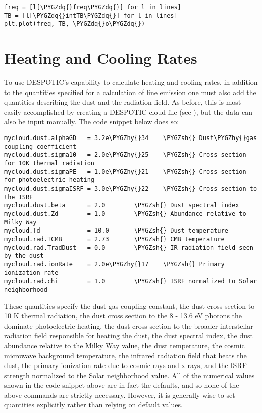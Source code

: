 \documentclass[letterpaper,10pt,english]{sphinxmanual}
\def\PYGZsh{\char`\#}
\def\PYGZhy{\char`\-}
\def\PYGZdq{\char`\"}
\begin{document}
\begin{Verbatim}[commandchars=\\\{\}]
freq = [l[\PYGZdq{}freq\PYGZdq{}] for l in lines]
TB = [l[\PYGZdq{}intTB\PYGZdq{}] for l in lines]
plt.plot(freq, TB, \PYGZdq{}o\PYGZdq{})
\end{Verbatim}


\section{Heating and Cooling Rates}
\label{functions:heating-and-cooling-rates}
To use DESPOTIC's capability to calculate heating and cooling rates,
in addition to the quantities specified for a calculation of line
emission one must also add the quantities describing the dust and the
radiation field. As before, this is most easily accomplished by
creating a DESPOTIC cloud file (see {\hyperref[cloudfiles:sec\string-cloudfiles]{}}), but the
data can also be input manually. The code snippet below does so:

\begin{Verbatim}[commandchars=\\\{\}]
mycloud.dust.alphaGD   = 3.2e\PYGZhy{}34    \PYGZsh{} Dust\PYGZhy{}gas coupling coefficient
mycloud.dust.sigma10   = 2.0e\PYGZhy{}25    \PYGZsh{} Cross section for 10K thermal radiation
mycloud.dust.sigmaPE   = 1.0e\PYGZhy{}21    \PYGZsh{} Cross section for photoelectric heating
mycloud.dust.sigmaISRF = 3.0e\PYGZhy{}22    \PYGZsh{} Cross section to the ISRF
mycloud.dust.beta      = 2.0        \PYGZsh{} Dust spectral index
mycloud.dust.Zd        = 1.0        \PYGZsh{} Abundance relative to Milky Way
mycloud.Td             = 10.0       \PYGZsh{} Dust temperature
mycloud.rad.TCMB       = 2.73       \PYGZsh{} CMB temperature
mycloud.rad.TradDust   = 0.0        \PYGZsh{} IR radiation field seen by the dust
mycloud.rad.ionRate    = 2.0e\PYGZhy{}17    \PYGZsh{} Primary ionization rate
mycloud.rad.chi        = 1.0        \PYGZsh{} ISRF normalized to Solar neighborhood
\end{Verbatim}

These quantities specify the dust-gas coupling constant, the dust
cross section to 10 K thermal radiation, the dust cross section to the
8 - 13.6 eV photons the dominate photoelectric heating, the dust cross
section to the broader interstellar radiation field responsible for
heating the dust, the dust spectral index, the dust abundance relative
to the Milky Way value, the dust temperature, the cosmic microwave
background temperature, the infrared radiation field that heats the
dust, the primary ionization rate due to cosmic rays and x-rays, and
the ISRF strength normalized to the Solar neighborhood value. All of
the numerical values shown in the code snippet above are in fact the
defaults, and so none of the above commands are strictly
necessary. However, it is generally wise to set quantities explicitly
rather than relying on default values.
\end{document}
